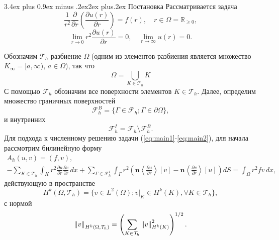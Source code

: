 \documentclass[a4paper,12pt, russian, titlepage]{article} %
\makeatletter
\numberwithin{equation}{section}
\renewcommand{\vec}[1]{\mathbf{#1}}
\renewcommand{\section}{\@startsection{section}{1}{1cm}%
{3.4ex plus 0.9ex minus .2ex}{2ex plus.2ex}%
{\normalfont\large\bfseries}}
\numberwithin{theorem}{subsection}
\numberwithin{definition}{subsection}
\numberwithin{proposition}{subsection}
\makeatother
\begin{document}
\section{Постановка}
Рассматривается задача 
\begin{equation}\label{eq:main1}
\frac{1}{r^2}\frac{\partial}{\partial r}\left(\frac{\partial u(r)}{\partial r}  \right) = f(r), \quad r \in \Omega =  \mathbb{R}_{\ge 0},
\end{equation}
\begin{equation}\label{eq:main2}
\lim_{r \to 0}r^2 \frac{\partial u(r)}{\partial r} = 0, \quad \lim_{r \to \infty} u(r) = 0.
\end{equation} \par
Обозначим $\mathcal{T}_h$ разбиение $\Omega$ (одним из элементов разбиения является множество $K_\infty = [a, \infty), \, a \in \Omega$), так что
\begin{equation}
\Omega = \bigcup_{K \in \mathcal{T}_h} K
\end{equation}
С помощью $\mathcal{F}_h$ обозначим все поверхности элементов $K \in \mathcal{T}_h$. Далее, определим множество граничных поверхностей
\begin{equation}
\mathcal{F}_h^B = \{\Gamma \in \mathcal{F}_h; \Gamma \in \partial \Omega \},
\end{equation}
и внутренних
\begin{equation}
\mathcal{F}_h^I =  \mathcal{F}_h \setminus \mathcal{F}_h^B.
\end{equation}
Для подхода к численному решению задачи (\ref{eq:main1}-\ref{eq:main2}), для начала рассмотрим билинейную форму
\begin{gather}\label{eq:main_weak}
A_h(u, v) = (f, v), \\
-\sum_{K \in \mathcal{T}_h} \int_K r^2 \frac{\partial u}{\partial r} \frac{\partial v}{\partial r} \, dx + \sum_{\Gamma \in \mathcal{F}^{I}_h} \int_\Gamma r^2 \left(\vec{n} \left \langle \frac{\partial u}{\partial r} \right\rangle [v] - \vec{n}  \left\langle \frac{\partial v}{\partial r} \right\rangle [u] \right) dS = \int_\Omega r^2 f v \, dx, 
\end{gather} 
действующую в пространстве
\begin{equation}
H^k(\Omega, \mathcal{T}_h) = \{v \in L^2(\Omega); v|_K\in H^k(K), \forall K \in \mathcal{T}_h \},
\end{equation}
с нормой
\begin{equation}
\norm{v}_{H^k(\Omega, \mathcal{T}_h)} = \left(\sum_{K \in \mathcal{T}_h} \norm{v}^2_{H^k(K)} \right)^{1/2}.
\end{equation}\par
\end{document}
